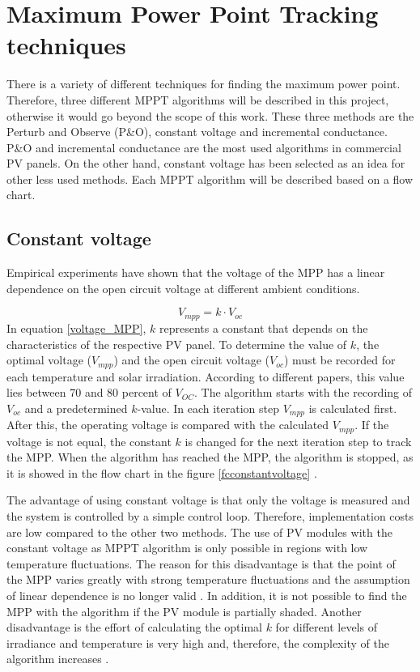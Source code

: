 \section{Maximum Power Point Tracking techniques\label{MPPTalgo}}

There is a variety of different techniques for finding the maximum power point. Therefore, three different MPPT algorithms will be described in this project, otherwise it would go beyond the scope of this work. These three methods are the Perturb and Observe (P\&O), constant voltage and incremental conductance. P\&O and incremental conductance are the most used algorithms in commercial PV panels. On the other hand, constant voltage has been selected as an idea for other less used methods. Each MPPT algorithm will be described based on a flow chart. 

\subsection{Constant voltage}
Empirical experiments have shown that the voltage of the MPP has a linear dependence on the open circuit voltage at different ambient conditions.

\begin{equation} \label{voltage_MPP}
V_{mpp} = k \cdot V_{oc}	
\end{equation} 
In equation \ref{voltage_MPP}, $k$ represents a constant that depends on the characteristics of the respective PV panel. To determine the value of $k$, the optimal voltage ($V_{mpp}$) and the open circuit voltage ($V_{oc}$) must be recorded for each temperature and solar irradiation. According to different papers, this value lies between 70 and 80 percent of $V_{OC}$\cite{MPPTResearch}. The algorithm starts with the recording of $V_{oc}$ and a predetermined $k$-value. In each iteration step $V_{mpp}$ is calculated first. After this, the operating voltage is compared with the calculated $V_{mpp}$. If the voltage is not equal, the constant $k$ is changed for the next iteration step to track the MPP. When the algorithm has reached the MPP, the algorithm is stopped, as it is showed in the flow chart in the figure \ref{fcconstantvoltage} \cite{flowchartVC}. 

The advantage of using constant voltage is that only the voltage is measured and the system is controlled by a simple control loop. Therefore, implementation costs are low compared to the other two methods. The use of PV modules with the constant voltage as MPPT algorithm is only possible in regions with low temperature fluctuations. The reason for this disadvantage is that the point of the MPP varies greatly with strong temperature fluctuations and the assumption of linear dependence is no longer valid . In addition, it is not possible to find the MPP with the algorithm if the PV module is partially shaded. Another disadvantage is the effort of calculating the optimal $k$ for different levels of irradiance and temperature is very high and, therefore, the complexity of the algorithm increases \cite{flowchartVC}.

